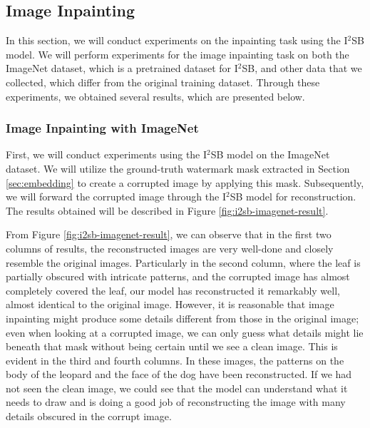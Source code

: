 \subsection{Image Inpainting}
In this section, we will conduct experiments on the inpainting task using the I$^2$SB model. We will perform experiments for the image inpainting task on both the ImageNet dataset, which is a pretrained dataset for I$^2$SB, and other data that we collected, which differ from the original training dataset. Through these experiments, we obtained several results, which are presented below.

\subsubsection{Image Inpainting with ImageNet}
First, we will conduct experiments using the I$^2$SB model on the ImageNet dataset. We will utilize the ground-truth watermark mask extracted in Section \ref{sec:embedding} to create a corrupted image by applying this mask. Subsequently, we will forward the corrupted image through the I$^2$SB model for reconstruction. The results obtained will be described in Figure \ref{fig:i2sb-imagenet-result}.

From Figure \ref{fig:i2sb-imagenet-result}, we can observe that in the first two columns of results, the reconstructed images are very well-done and closely resemble the original images. Particularly in the second column, where the leaf is partially obscured with intricate patterns, and the corrupted image has almost completely covered the leaf, our model has reconstructed it remarkably well, almost identical to the original image. However, it is reasonable that image inpainting might produce some details different from those in the original image; even when looking at a corrupted image, we can only guess what details might lie beneath that mask without being certain until we see a clean image. This is evident in the third and fourth columns. In these images, the patterns on the body of the leopard and the face of the dog have been reconstructed. If we had not seen the clean image, we could see that the model can understand what it needs to draw and is doing a good job of reconstructing the image with many details obscured in the corrupt image.

